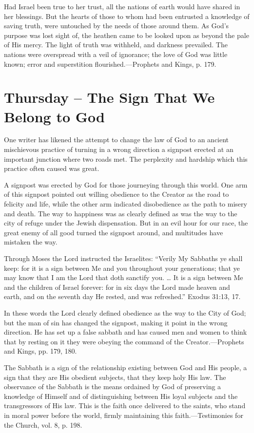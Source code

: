 \documentclass[a4paper, 10pt, twoside, headings=small]{scrartcl}
\begin{document}
\begin{multicols}{2}
Had Israel been true to her trust, all the nations of earth would have shared in her blessings. But the hearts of those to whom had been entrusted a knowledge of saving truth, were untouched by the needs of those around them. As God’s purpose was lost sight of, the heathen came to be looked upon as beyond the pale of His mercy. The light of truth was withheld, and darkness prevailed. The nations were overspread with a veil of ignorance; the love of God was little known; error and superstition flourished.—Prophets and Kings, p. 179.

\section*{Thursday – The Sign That We Belong to God}

One writer has likened the attempt to change the law of God to an ancient mischievous practice of turning in a wrong direction a signpost erected at an important junction where two roads met. The perplexity and hardship which this practice often caused was great.

A signpost was erected by God for those journeying through this world. One arm of this signpost pointed out willing obedience to the Creator as the road to felicity and life, while the other arm indicated disobedience as the path to misery and death. The way to happiness was as clearly defined as was the way to the city of refuge under the Jewish dispensation. But in an evil hour for our race, the great enemy of all good turned the signpost around, and multitudes have mistaken the way.

Through Moses the Lord instructed the Israelites: “Verily My Sabbaths ye shall keep: for it is a sign between Me and you throughout your generations; that ye may know that I am the Lord that doth sanctify you. … It is a sign between Me and the children of Israel forever: for in six days the Lord made heaven and earth, and on the seventh day He rested, and was refreshed.” Exodus 31:13, 17.

In these words the Lord clearly defined obedience as the way to the City of God; but the man of sin has changed the signpost, making it point in the wrong direction. He has set up a false sabbath and has caused men and women to think that by resting on it they were obeying the command of the Creator.—Prophets and Kings, pp. 179, 180.

The Sabbath is a sign of the relationship existing between God and His people, a sign that they are His obedient subjects, that they keep holy His law. The observance of the Sabbath is the means ordained by God of preserving a knowledge of Himself and of distinguishing between His loyal subjects and the transgressors of His law. This is the faith once delivered to the saints, who stand in moral power before the world, firmly maintaining this faith.—Testimonies for the Church, vol. 8, p. 198.


\end{multicols}
\end{document}
